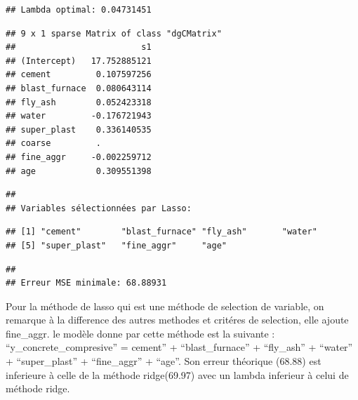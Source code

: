 \documentclass[
  12pt,
]{article}
\begin{document}
\begin{verbatim}
## Lambda optimal: 0.04731451
\end{verbatim}

\begin{verbatim}
## 9 x 1 sparse Matrix of class "dgCMatrix"
##                         s1
## (Intercept)   17.752885121
## cement         0.107597256
## blast_furnace  0.080643114
## fly_ash        0.052423318
## water         -0.176721943
## super_plast    0.336140535
## coarse         .          
## fine_aggr     -0.002259712
## age            0.309551398
\end{verbatim}

\begin{verbatim}
## 
## Variables sélectionnées par Lasso:
\end{verbatim}

\begin{verbatim}
## [1] "cement"        "blast_furnace" "fly_ash"       "water"        
## [5] "super_plast"   "fine_aggr"     "age"
\end{verbatim}

\begin{verbatim}
## 
## Erreur MSE minimale: 68.88931
\end{verbatim}

Pour la méthode de lasso qui est une méthode de selection de variable,
on remarque à la difference des autres methodes et critéres de
selection, elle ajoute fine\_aggr. le modèle donne par cette méthode est
la suivante : ``y\_concrete\_compresive'' = cement'' +
``blast\_furnace'' + ``fly\_ash'' + ``water'' + ``super\_plast'' +
``fine\_aggr'' + ``age''. Son erreur théorique (68.88) est inferieure à
celle de la méthode ridge(69.97) avec un lambda inferieur à celui de
méthode ridge.
\end{document}
